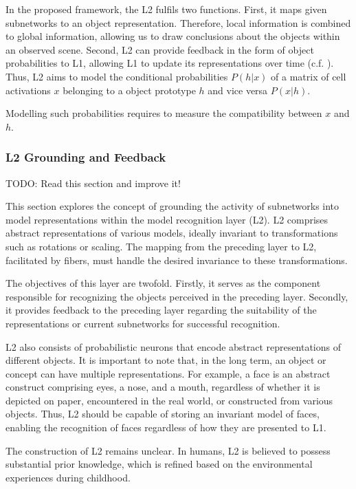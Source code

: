 In the proposed framework, the L2 fulfils two functions. First, it maps given subnetworks to an object representation. Therefore, local information is combined to global information, allowing us to draw conclusions about the objects within an observed scene. Second, L2 can provide feedback in the form of object probabilities to L1, allowing L1 to update its representations over time (c.f. ).
Thus, L2 aims to model the conditional probabilities $P(h|x)$ of a matrix of cell activations $x$ belonging to a object prototype $h$ and vice versa $P(x|h)$.

Modelling such probabilities requires to measure the compatibility between $x$ and $h$. 





\subsubsection{L2 Grounding and Feedback}
TODO: Read this section and improve it!

This section explores the concept of grounding the activity of subnetworks into model representations within the model recognition layer (L2). L2 comprises abstract representations of various models, ideally invariant to transformations such as rotations or scaling. The mapping from the preceding layer to L2, facilitated by fibers, must handle the desired invariance to these transformations.

The objectives of this layer are twofold. Firstly, it serves as the component responsible for recognizing the objects perceived in the preceding layer. Secondly, it provides feedback to the preceding layer regarding the suitability of the representations or current subnetworks for successful recognition.

L2 also consists of probabilistic neurons that encode abstract representations of different objects. It is important to note that, in the long term, an object or concept can have multiple representations. For example, a face is an abstract construct comprising eyes, a nose, and a mouth, regardless of whether it is depicted on paper, encountered in the real world, or constructed from various objects. Thus, L2 should be capable of storing an invariant model of faces, enabling the recognition of faces regardless of how they are presented to L1.

The construction of L2 remains unclear. In humans, L2 is believed to possess substantial prior knowledge, which is refined based on the environmental experiences during childhood.

